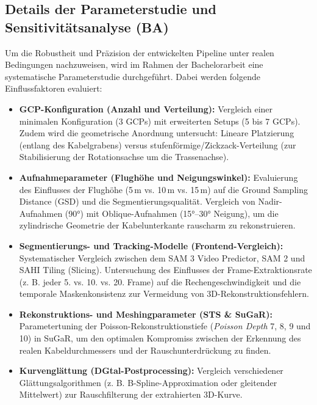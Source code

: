 \documentclass[12pt,a4paper]{article}
\begin{document}
\subsection*{Details der Parameterstudie und Sensitivitätsanalyse (BA)}
Um die Robustheit und Präzision der entwickelten Pipeline unter realen Bedingungen nachzuweisen, wird im Rahmen der Bachelorarbeit eine systematische Parameterstudie durchgeführt. Dabei werden folgende Einflussfaktoren evaluiert:
\begin{itemize}[noitemsep]
    \item \textbf{GCP-Konfiguration (Anzahl und Verteilung):} Vergleich einer minimalen Konfiguration (3 GCPs) mit erweiterten Setups (5 bis 7 GCPs). Zudem wird die geometrische Anordnung untersucht: Lineare Platzierung (entlang des Kabelgrabens) versus stufenförmige/Zickzack-Verteilung (zur Stabilisierung der Rotationsachse um die Trassenachse).
    \item \textbf{Aufnahmeparameter (Flughöhe und Neigungswinkel):} Evaluierung des Einflusses der Flughöhe (5\,m vs. 10\,m vs. 15\,m) auf die Ground Sampling Distance (GSD) und die Segmentierungsqualität. Vergleich von Nadir-Aufnahmen (90°) mit Oblique-Aufnahmen (15°--30° Neigung), um die zylindrische Geometrie der Kabelunterkante rauscharm zu rekonstruieren.
    \item \textbf{Segmentierungs- und Tracking-Modelle (Frontend-Vergleich):} Systematischer Vergleich zwischen dem SAM 3 Video Predictor, SAM 2 und SAHI Tiling (Slicing). Untersuchung des Einflusses der Frame-Extraktionsrate (z. B. jeder 5. vs. 10. vs. 20. Frame) auf die Rechengeschwindigkeit und die temporale Maskenkonsistenz zur Vermeidung von 3D-Rekonstruktionsfehlern.
    \item \textbf{Rekonstruktions- und Meshingparameter (STS \& SuGaR):} Parametertuning der Poisson-Rekonstruktionstiefe (\textit{Poisson Depth} 7, 8, 9 und 10) in SuGaR, um den optimalen Kompromiss zwischen der Erkennung des realen Kabeldurchmessers und der Rauschunterdrückung zu finden.
    \item \textbf{Kurvenglättung (DGtal-Postprocessing):} Vergleich verschiedener Glättungsalgorithmen (z. B. B-Spline-Approximation oder gleitender Mittelwert) zur Rauschfilterung der extrahierten 3D-Kurve.
\end{itemize}
\end{document}
